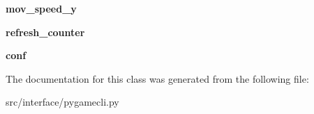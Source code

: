 \begin{DoxyCompactItemize}
\item 
\hypertarget{classinterface_1_1pygamecli_1_1_client_a5873c97fb0648bd1326ca1b0c7358847}{{\bfseries mov\-\_\-speed\-\_\-y}}\label{classinterface_1_1pygamecli_1_1_client_a5873c97fb0648bd1326ca1b0c7358847}

\item 
\hypertarget{classinterface_1_1pygamecli_1_1_client_a3ffb39f9ae93cfae520080286d2d813d}{{\bfseries refresh\-\_\-counter}}\label{classinterface_1_1pygamecli_1_1_client_a3ffb39f9ae93cfae520080286d2d813d}

\item 
\hypertarget{classinterface_1_1pygamecli_1_1_client_a630ff935559ffad8d89d31cc96ebca72}{{\bfseries conf}}\label{classinterface_1_1pygamecli_1_1_client_a630ff935559ffad8d89d31cc96ebca72}

\end{DoxyCompactItemize}


\-The documentation for this class was generated from the following file\-:\begin{DoxyCompactItemize}
\item 
src/interface/pygamecli.\-py\end{DoxyCompactItemize}
